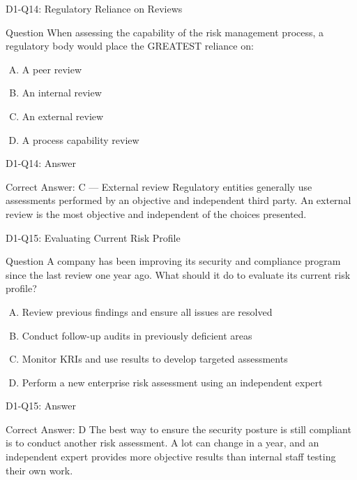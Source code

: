 \documentclass{beamer}
\begin{document}
	\begin{frame}{D1-Q14: Regulatory Reliance on Reviews}
		\begin{block}{Question}
			When assessing the capability of the risk management process, a regulatory body would place the GREATEST reliance on:
		\end{block}
		\begin{enumerate}[(A)]
			\item A peer review
			\item An internal review
			\item An external review
			\item A process capability review
		\end{enumerate}
	\end{frame}
	\begin{frame}{D1-Q14: Answer}
		\begin{block}{Correct Answer: C --- External review}
			Regulatory entities generally use assessments performed by an objective and independent third party. An external review is the most objective and independent of the choices presented.
		\end{block}
	\end{frame}
	
	\begin{frame}{D1-Q15: Evaluating Current Risk Profile}
		\begin{block}{Question}
			A company has been improving its security and compliance program since the last review one year ago. What should it do to evaluate its current risk profile?
		\end{block}
		\begin{enumerate}[(A)]
			\item Review previous findings and ensure all issues are resolved
			\item Conduct follow-up audits in previously deficient areas
			\item Monitor KRIs and use results to develop targeted assessments
			\item Perform a new enterprise risk assessment using an independent expert
		\end{enumerate}
	\end{frame}
	\begin{frame}{D1-Q15: Answer}
		\begin{block}{Correct Answer: D}
			The best way to ensure the security posture is still compliant is to conduct another risk assessment. A lot can change in a year, and an independent expert provides more objective results than internal staff testing their own work.
		\end{block}
	\end{frame}
	
\end{document}
